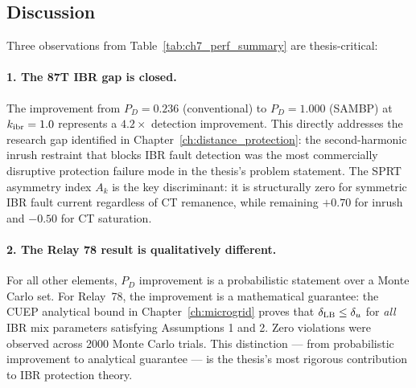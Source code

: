 \begin{table}[ht]
  \smallskip{}
\end{table}

\subsection{Discussion}

Three observations from Table~\ref{tab:ch7_perf_summary} are thesis-critical:

\paragraph{1. The 87T IBR gap is closed.}  The improvement from $P_D = 0.236$
(conventional) to $P_D = 1.000$ (SAMBP) at $k_{\rm ibr} = 1.0$ represents a
$4.2\times$ detection improvement.  This directly addresses the research
gap identified in Chapter~\ref{ch:distance_protection}: the second-harmonic
inrush restraint that blocks IBR fault detection was the most commercially
disruptive protection failure mode in the thesis's problem statement.
The SPRT asymmetry index $A_k$ is the key discriminant: it is structurally
zero for symmetric IBR fault current regardless of CT remanence, while
remaining $+0.70$ for inrush and $-0.50$ for CT saturation.

\paragraph{2. The Relay 78 result is qualitatively different.}  For all
other elements, $P_D$ improvement is a probabilistic statement over a
Monte Carlo set.  For Relay~78, the improvement is a mathematical
guarantee: the CUEP analytical bound in Chapter~\ref{ch:microgrid}
proves that $\delta_{\rm LB} \leq \delta_u$ for \emph{all} IBR mix
parameters satisfying Assumptions 1 and 2.  Zero violations were observed
across 2000 Monte Carlo trials.  This distinction — from probabilistic
improvement to analytical guarantee — is the thesis's most rigorous
contribution to IBR protection theory.


